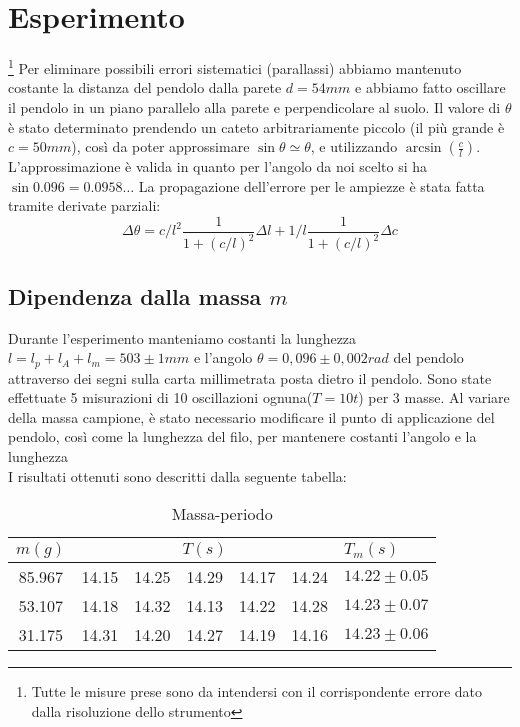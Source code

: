 \documentclass[a4paper,10pt]{article}
\begin{document}
\section{Esperimento}
\footnote{Tutte le misure prese sono da intendersi con il corrispondente errore dato dalla risoluzione dello strumento}
Per eliminare possibili errori sistematici (parallassi) abbiamo mantenuto costante la distanza del pendolo dalla parete  $d=54mm$ e abbiamo fatto oscillare il pendolo in un piano parallelo alla parete e perpendicolare al suolo.
Il valore di $\theta$  è stato determinato prendendo un cateto arbitrariamente piccolo (il più grande è $c=50mm$), così da poter approssimare $\sin{\theta}\simeq{\theta}$, e utilizzando $\arcsin({\frac{c}{l}})$. 
L'approssimazione è valida in quanto per l'angolo da noi scelto si ha $\sin{0.096}=0.0958\dots$
La propagazione dell'errore per le ampiezze è stata fatta tramite derivate parziali:
\begin{equation}
\Delta\theta=c/{l^2 }\frac{1}{1+(c/l)^2}\Delta l+ 1/l\frac{1}{1+(c/l)^2}\Delta c
\end{equation}

\subsection{Dipendenza dalla massa $m$ }
Durante l'esperimento manteniamo costanti la lunghezza $l=l_p+l_A+l_m=503\pm 1mm$ e l'angolo $\theta=0,096\pm0,002 rad$ del pendolo attraverso dei segni sulla carta millimetrata posta dietro il pendolo.
Sono state effettuate 5 misurazioni di 10 oscillazioni ognuna($T=10t$) per 3 masse.
Al variare della massa campione, è stato necessario modificare il punto di applicazione del pendolo, così come la lunghezza del filo,
per mantenere costanti l'angolo e la lunghezza
\\I risultati ottenuti sono descritti dalla seguente tabella:\\

\begin{table}[!htb]
\centering
\caption{Massa-periodo}
\label{my-label}
\begin{tabular}{c|ccccc|l}
$m(g)$ & \multicolumn{5}{c|}{$T(s)$}           & $T_m(s)$       \\ \hline
85.967 & 14.15 & 14.25 & 14.29 & 14.17 & 14.24 & $14.22\pm0.05$ \\
53.107 & 14.18 & 14.32 & 14.13 & 14.22 & 14.28 & $14.23\pm0.07$ \\
31.175 & 14.31 & 14.20 & 14.27 & 14.19 & 14.16 & $14.23\pm0.06$
\end{tabular}
\end{table}
\end{document}
